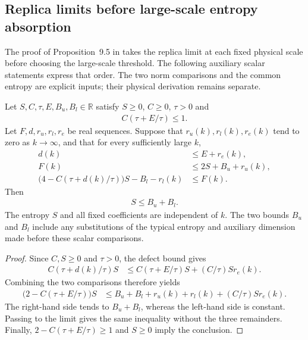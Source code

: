 \subsection{Replica limits before large-scale entropy absorption}

The proof of Proposition~9.5 in
\cite[Section~9, lines~755--769]{OpenAI2026AreaLaw} takes the replica
limit at each fixed physical scale before choosing the large-scale
threshold. The following auxiliary scalar statements express that order.
The two norm comparisons and the common entropy are explicit inputs;
their physical derivation remains separate.

\begin{lemma}
    \label{thm:area_law_bootstrap_replica_absorption}
    \leanok
    Let $S,C,\tau,E,B_u,B_l\in\mathbb R$ satisfy $S\ge0$, $C\ge0$,
    $\tau>0$ and
    \begin{align}
        C(\tau+E/\tau)\le1.
    \end{align}
    Let $F,d,r_u,r_l,r_e$ be real sequences. Suppose that
    $r_u(k),r_l(k),r_e(k)$ tend to zero as $k\to\infty$, and that
    for every sufficiently large $k$,
    \begin{align}
        d(k)                                        & \le E+r_e(k),     \\
        F(k)                                        & \le2S+B_u+r_u(k), \\
        \bigl(4-C(\tau+d(k)/\tau)\bigr)S-B_l-r_l(k) & \le F(k).
    \end{align}
    Then
    \begin{align}
        S\le B_u+B_l.
    \end{align}
    The entropy $S$ and all fixed coefficients are independent of $k$.
    The two bounds $B_u$ and $B_l$ include any substitutions of the typical entropy
    and auxiliary dimension made before these scalar comparisons.
\end{lemma}
\begin{proof}
    \leanok
    Since $C,S\ge0$ and $\tau>0$, the defect bound gives
    \begin{align}
        C(\tau+d(k)/\tau)S
         & \le C(\tau+E/\tau)S+(C/\tau)Sr_e(k).
    \end{align}
    Combining the two comparisons therefore yields
    \begin{align}
        \bigl(2-C(\tau+E/\tau)\bigr)S
         & \le B_u+B_l+r_u(k)+r_l(k)+(C/\tau)Sr_e(k).
    \end{align}
    The right-hand side tends to $B_u+B_l$, whereas the left-hand
    side is constant. Passing to the limit gives the same inequality
    without the three remainders. Finally,
    $2-C(\tau+E/\tau)\ge1$ and $S\ge0$ imply the conclusion.
\end{proof}

